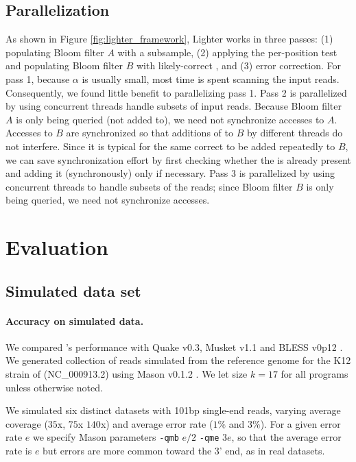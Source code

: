 \documentclass{bmcart}
\begin{document}
\subsection*{Parallelization} 
As shown in Figure \ref{fig:lighter_framework}, Lighter works in three passes: (1) populating Bloom filter $A$ with a \kmer subsample, (2) applying the per-position test and populating Bloom filter $B$ with likely-correct \kmers, and (3) error correction.  For pass 1, because $\alpha$ is usually small, most time is spent scanning the input reads.  Consequently, we found little benefit to parallelizing pass 1.  Pass 2 is parallelized by using concurrent threads handle subsets of input reads.  Because Bloom filter $A$ is only being queried (not added to), we need not synchronize accesses to $A$.  Accesses to $B$ are synchronized so that additions of \kmers to $B$ by different threads do not interfere.  Since it is typical for the same correct \kmer to be added repeatedly to $B$, we can save synchronization effort by first checking whether the \kmer is already present and adding it (synchronously) only if necessary.  Pass 3 is parallelized by using concurrent threads to handle subsets of the reads; since Bloom filter $B$ is only being queried, we need not synchronize accesses.

\section*{Evaluation}
\subsection*{Simulated data set}

\paragraph{Accuracy on simulated data.} We compared \tool's performance with Quake v0.3\cite{kelley2010quake}, Musket v1.1\cite{liu2013musket} and BLESS v0p12 \cite{heo2014bless}.  We generated collection of reads simulated from the reference genome for the K12 strain of \ecoli (NC\_000913.2) using Mason v0.1.2 \cite{holtgrewe2010mason}.  We let \kmer size $k=17$ for all programs unless otherwise noted.

We simulated six distinct datasets with 101bp single-end reads, varying average coverage ($35$x, $75$x $140$x) and average error rate ($1\%$ and $3\%$).  For a given error rate $e$ we specify Mason parameters \verb+-qmb+ $e/2$ \verb+-qme+ $3e$, so that the average error rate is $e$ but errors are more common toward the 3' end, as in real datasets.
\end{document}
